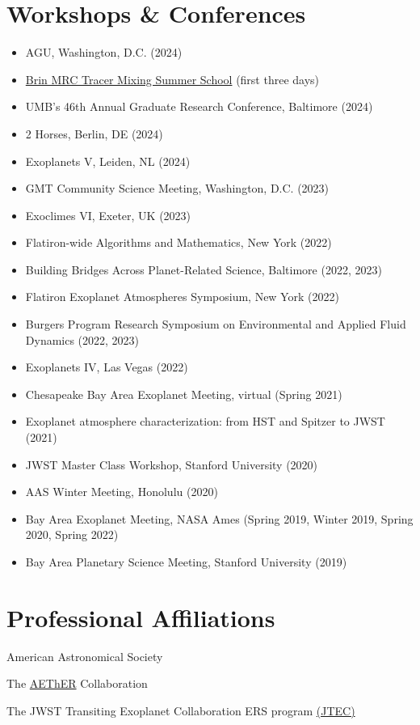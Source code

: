 \documentclass[letterpaper,10.5pt]{article}
\newcommand{\resumeItem}[2]{
  \item\small{
    \textbf{#1}{#2 \vspace{-2pt}}
  }
}
\newcommand{\resumeSubHeadingListStart}{\begin{itemize}[leftmargin=*]}
\newcommand{\resumeItemListStart}{\begin{itemize}}
\newcommand{\resumeItemListEnd}{\end{itemize}\vspace{-5pt}}
\newcommand{\shorterSection}[1]{\vspace{-10pt}\section{#1}}
\begin{document}
\shorterSection{Workshops \& Conferences}
\resumeItemListStart
\resumeItem{}{AGU, Washington, D.C. (2024)}
\resumeItem{}{\href{https://brinmrc.umd.edu/programs/schools/summer24/summer24-school-mixing.html}{Brin MRC Tracer Mixing Summer School} (first three days)}
\resumeItem{}{UMB's 46th Annual Graduate Research Conference, Baltimore (2024)}
\resumeItem{}{2 Horses, Berlin, DE (2024)}
\resumeItem{}{Exoplanets V, Leiden, NL (2024)}
\resumeItem{}{GMT Community Science Meeting, Washington, D.C. (2023)}
\resumeItem{}{Exoclimes VI, Exeter, UK (2023)}
\resumeItem{}{Flatiron-wide Algorithms and Mathematics, New York (2022)}
\resumeItem{}{Building Bridges Across Planet-Related Science, Baltimore (2022, 2023)}
\resumeItem{}{Flatiron Exoplanet Atmospheres Symposium, New York (2022)}
\resumeItem{}{Burgers Program Research
Symposium on Environmental and Applied Fluid Dynamics (2022, 2023)}
\resumeItem{}{Exoplanets IV, Las Vegas (2022)}
\resumeItem{}{Chesapeake Bay Area Exoplanet Meeting, virtual (Spring 2021)}
\resumeItem{}{Exoplanet atmosphere characterization: from HST and Spitzer to JWST (2021)}
\resumeItem{}{JWST Master Class Workshop, Stanford University (2020)}
\resumeItem{}{AAS Winter Meeting, Honolulu (2020)}
\resumeItem{}{Bay Area Exoplanet Meeting, NASA Ames (Spring 2019, Winter 2019, Spring 2020, Spring 2022)}
\resumeItem{}{Bay Area Planetary Science Meeting, Stanford University (2019)}
\resumeItemListEnd

\shorterSection{Professional Affiliations}
\small
  \begin{list}{}{\cvlist}
  \item[{\color{numcolor}}]American Astronomical Society
  \item[{\color{numcolor}}]The \href{https://planets.carnegiescience.edu/}{AEThER} Collaboration
  \item[{\color{numcolor}}]The JWST Transiting Exoplanet Collaboration ERS program \href{https://ers-transit.github.io/}{(JTEC)}



  \end{list}
\end{document}
